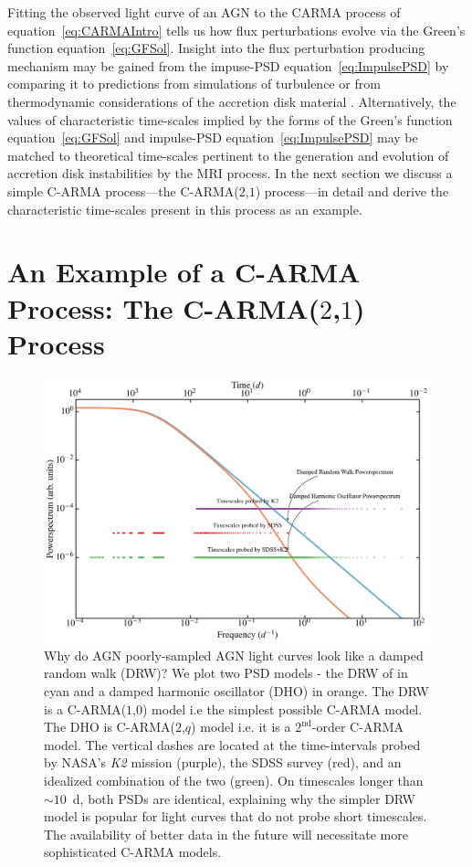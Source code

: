 \documentclass[a4paper,fleqn,usenatbib]{mnras}
\begin{document}
Fitting the observed light curve of an AGN to the CARMA process of equation~\eqref{eq:CARMAIntro} tells us how flux perturbations evolve via the Green's function equation~\eqref{eq:GFSol}. Insight into the flux perturbation producing mechanism may be gained from the impuse-PSD equation~\eqref{eq:ImpulsePSD} by comparing it to predictions from simulations of turbulence \citep{EddySim15} or from thermodynamic considerations of the accretion disk material \citep{Mellen52}. Alternatively, the values of characteristic time-scales implied by the forms of the Green's function equation~\eqref{eq:GFSol} and impulse-PSD equation~\eqref{eq:ImpulsePSD} may be matched to theoretical time-scales pertinent to the generation and evolution of accretion disk instabilities by the MRI process. In the next section we discuss a simple C-ARMA process---the C-ARMA($2$,$1$) process---in detail and derive the characteristic time-scales present in this process as an example.

\section[C-ARMA($2$,$1$)]{An Example of a C-ARMA Process: The C-ARMA($2$,$1$) Process}\label{sec:CARMA21}

\begin{figure}
    \includegraphics[width=\textwidth]{images/PowerOfSDSSK2.jpg}
    \caption{Why do AGN poorly-sampled AGN light curves look like a damped random walk (DRW)? We plot two PSD models - the DRW of \citet{Kelly09} in cyan and a damped harmonic oscillator (DHO) in orange. The DRW is a C-ARMA($1$,$0$) model i.e  the simplest possible C-ARMA model. The DHO is C-ARMA($2$,$q$) model i.e. it is a $2^{\text{nd}}$-order C-ARMA model. The vertical dashes are located at the time-intervals probed by NASA's \textit{K2} mission (purple), the SDSS survey (red), and an idealized combination of the two (green). On timescales longer than $\sim 10$~d, both PSDs are identical, explaining why the simpler DRW model is popular for light curves that do not probe short timescales. The availability of better data in the future will necessitate more sophisticated C-ARMA models.}
    \label{fig:PowerOfSDSSK2}
\end{figure}
\end{document}

